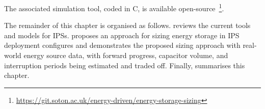 The associated simulation tool, coded in C, is available open-source~\footnote{\url{https://git.soton.ac.uk/energy-driven/energy-storage-sizing}}. 

The remainder of this chapter is organised as follows. 
 reviews the current tools and models for IPSs. 
 proposes an approach for sizing energy storage in IPS deployment 
 configures and demonstrates the proposed sizing approach with real-world energy source data, with forward progress, capacitor volume, and interruption periods being estimated and traded off.  
Finally,  summarises this chapter. 
